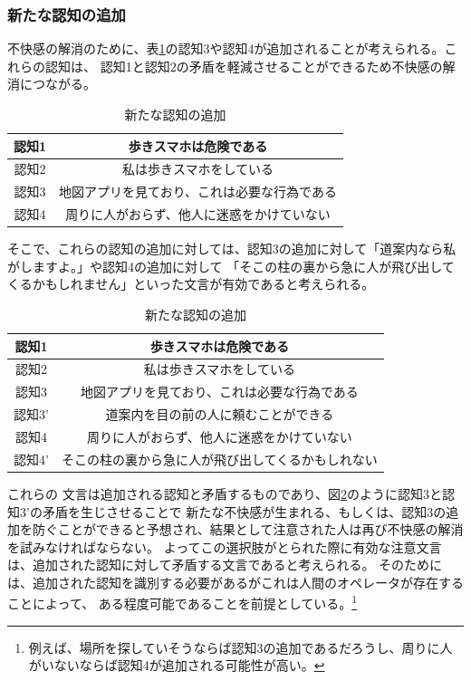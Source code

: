 \documentclass{kuisthesis}
\begin{document}
\subsubsection{新たな認知の追加}
不快感の解消のために、表\ref{fig: AvoidDissonance}の認知3や認知4が追加されることが考えられる。これらの認知は、
認知1と認知2の矛盾を軽減させることができるため不快感の解消につながる。
\begin{table}[h]
  \centering
  \begin{tabular}{c|c}
      認知1 & 歩きスマホは危険である \\ \hline
      認知2 & 私は歩きスマホをしている \\ \hline
      認知3 & 地図アプリを見ており、これは必要な行為である \\\hline
      認知4 & 周りに人がおらず、他人に迷惑をかけていない \\ 
  \end{tabular}
  \caption{新たな認知の追加}
  \label{fig: AvoidDissonance}
\end{table}
そこで、これらの認知の追加に対しては、認知3の追加に対して「道案内なら私がしますよ。」や認知4の追加に対して
「そこの柱の裏から急に人が飛び出してくるかもしれません」といった文言が有効であると考えられる。
\begin{table}[h]
  \centering
  \begin{tabular}{c|c}
      認知1 & 歩きスマホは危険である \\ \hline
      認知2 & 私は歩きスマホをしている \\ \hline
      認知3 & 地図アプリを見ており、これは必要な行為である \\
      認知3' & 道案内を目の前の人に頼むことができる \\ \hline
      認知4 & 周りに人がおらず、他人に迷惑をかけていない \\ 
      認知4' & そこの柱の裏から急に人が飛び出してくるかもしれない \\ 
  \end{tabular}
  \caption{新たな認知の追加}
  \label{fig: AvoidDissonanceBlock}
\end{table}
これらの
文言は追加される認知と矛盾するものであり、図\ref{fig: AvoidDissonanceBlock}のように認知3と認知3'の矛盾を生じさせることで
新たな不快感が生まれる、もしくは、認知3の追加を防ぐことができると予想され、結果として注意された人は再び不快感の解消を試みなければならない。
よってこの選択肢がとられた際に有効な注意文言は、追加された認知に対して矛盾する文言であると考えられる。
そのためには、追加された認知を識別する必要があるがこれは人間のオペレータが存在することによって、
ある程度可能であることを前提としている。\footnote[1]{例えば、場所を探していそうならば認知3の追加であるだろうし、周りに人がいないならば認知4が追加される可能性が高い。}
\end{document}
